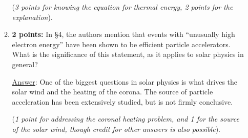 \documentclass[12pt]{article}
\begin{document}
\begin{enumerate}
\begin{enumerate}
{                    (\emph{3 points for knowing the equation for thermal energy,
                        2 points for the explanation}).}

            \item \textbf{2 points:} In \S 4, the authors mention that events with ``unusually
                high electron energy'' have been shown to be efficient particle
                accelerators. What is the significance of this statement,
                as it applies to solar physics in general?

                {\small \underline{Answer}: One of the biggest questions in
                solar physics is what drives the solar wind and
                the heating of the corona. The source of particle acceleration
                has been extensively studied, but is not firmly conclusive.

                (\emph{1 point for addressing the coronal heating problem, and 1
                for the source of the solar wind, though credit for other answers
                is also possible}).}
        \end{enumerate}
\end{enumerate}
\end{document}
